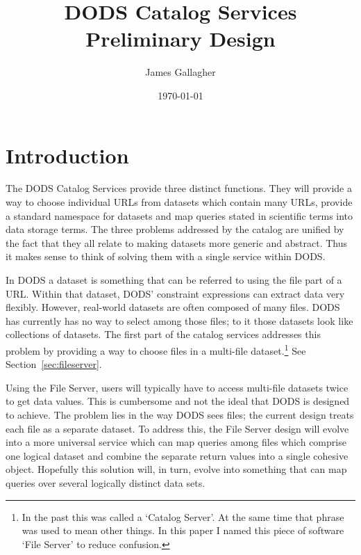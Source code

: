 \documentclass[12pt]{article}
\begin{document}
\title{DODS Catalog Services Preliminary Design} 
\author{James Gallagher}
\date{\today}

\maketitle

\begin{htmlonly}
\end{htmlonly}

\tableofcontents

\section{Introduction}

The DODS Catalog Services provide three distinct functions. They will provide
a way to choose individual URLs from datasets which contain many URLs,
provide a standard namespace for datasets and map queries stated in
scientific terms into data storage terms. The three problems addressed by
the catalog are unified by the fact that they all relate to making datasets
more generic and abstract. Thus it makes sense to think of solving them with
a single service within DODS.


In DODS a dataset is something that can be referred to using the file part of
a URL. Within that dataset, DODS' constraint expressions can extract data
very flexibly. However, real-world datasets are often composed of many files.
DODS has currently has no way to select among those files; to it those
datasets look like collections of datasets. The first part of the catalog
services addresses this problem by providing a way to choose files in a
multi-file dataset.\footnote{In the past this was called a `Catalog Server'.
  At the same time that phrase was used to mean other things. In this paper I
  named this piece of software `File Server' to reduce confusion.} See Section~\ref{sec:fileserver}.

Using the File Server, users will typically have to access multi-file
datasets twice to get data values. This is cumbersome and not the ideal that
DODS is designed to achieve. The problem lies in the way DODS sees files; the
current design treats each file as a separate dataset. To address this, the
File Server design will evolve into a more universal service which can map
queries among files which comprise one logical dataset and combine the
separate return values into a single cohesive object. Hopefully this solution
will, in turn, evolve into something that can map queries over several
logically distinct data sets.
\end{document}
